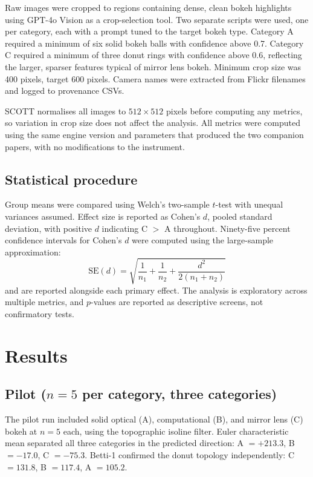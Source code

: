 \documentclass[11pt,a4paper]{article}
\begin{document}
Raw images were cropped to regions containing dense, clean bokeh highlights using GPT-4o Vision as a crop-selection tool. Two separate scripts were used, one per category, each with a prompt tuned to the target bokeh type. Category A required a minimum of six solid bokeh balls with confidence above 0.7. Category C required a minimum of three donut rings with confidence above 0.6, reflecting the larger, sparser features typical of mirror lens bokeh. Minimum crop size was 400 pixels, target 600 pixels. Camera names were extracted from Flickr filenames and logged to provenance CSVs.

SCOTT normalises all images to $512 \times 512$ pixels before computing any metrics, so variation in crop size does not affect the analysis. All metrics were computed using the same engine version and parameters that produced the two companion papers, with no modifications to the instrument.

\subsection{Statistical procedure}

Group means were compared using Welch's two-sample $t$-test with unequal variances assumed. Effect size is reported as Cohen's $d$, pooled standard deviation, with positive $d$ indicating C $>$ A throughout. Ninety-five percent confidence intervals for Cohen's $d$ were computed using the large-sample approximation:
\[
\text{SE}(d) = \sqrt{\frac{1}{n_1} + \frac{1}{n_2} + \frac{d^2}{2(n_1 + n_2)}}
\]
and are reported alongside each primary effect. The analysis is exploratory across multiple metrics, and $p$-values are reported as descriptive screens, not confirmatory tests.

\section{Results}

\subsection{Pilot ($n=5$ per category, three categories)}

The pilot run included solid optical (A), computational (B), and mirror lens (C) bokeh at $n=5$ each, using the topographic isoline filter. Euler characteristic mean separated all three categories in the predicted direction: A $= +213.3$, B $= -17.0$, C $= -75.3$. Betti-1 confirmed the donut topology independently: C $= 131.8$, B $= 117.4$, A $= 105.2$.
\end{document}
